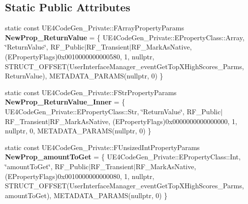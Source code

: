 \subsection*{Static Public Attributes}
\begin{DoxyCompactItemize}
\item 
\mbox{\label{struct_z___construct___u_function___a_user_interface_manager___get_top_x_high_scores___statics_a0b5ca5e952bd0680809e0706c322692e}} 
static const U\+E4\+Code\+Gen\+\_\+\+Private\+::\+F\+Array\+Property\+Params {\bfseries New\+Prop\+\_\+\+Return\+Value} = \{ U\+E4\+Code\+Gen\+\_\+\+Private\+::\+E\+Property\+Class\+::\+Array, \char`\"{}Return\+Value\char`\"{}, R\+F\+\_\+\+Public$\vert$R\+F\+\_\+\+Transient$\vert$R\+F\+\_\+\+Mark\+As\+Native, (E\+Property\+Flags)0x0010000000000580, 1, nullptr, S\+T\+R\+U\+C\+T\+\_\+\+O\+F\+F\+S\+E\+T(\+User\+Interface\+Manager\+\_\+event\+Get\+Top\+X\+High\+Scores\+\_\+\+Parms, Return\+Value), M\+E\+T\+A\+D\+A\+T\+A\+\_\+\+P\+A\+R\+A\+M\+S(nullptr, 0) \}
\item 
\mbox{\label{struct_z___construct___u_function___a_user_interface_manager___get_top_x_high_scores___statics_ac6b9b1cb1cc113a40d808ecae8dc31c2}} 
static const U\+E4\+Code\+Gen\+\_\+\+Private\+::\+F\+Str\+Property\+Params {\bfseries New\+Prop\+\_\+\+Return\+Value\+\_\+\+Inner} = \{ U\+E4\+Code\+Gen\+\_\+\+Private\+::\+E\+Property\+Class\+::\+Str, \char`\"{}Return\+Value\char`\"{}, R\+F\+\_\+\+Public$\vert$R\+F\+\_\+\+Transient$\vert$R\+F\+\_\+\+Mark\+As\+Native, (E\+Property\+Flags)0x0000000000000000, 1, nullptr, 0, M\+E\+T\+A\+D\+A\+T\+A\+\_\+\+P\+A\+R\+A\+M\+S(nullptr, 0) \}
\item 
\mbox{\label{struct_z___construct___u_function___a_user_interface_manager___get_top_x_high_scores___statics_abe99eeaac60ee4faea43c4ac5ee44198}} 
static const U\+E4\+Code\+Gen\+\_\+\+Private\+::\+F\+Unsized\+Int\+Property\+Params {\bfseries New\+Prop\+\_\+amount\+To\+Get} = \{ U\+E4\+Code\+Gen\+\_\+\+Private\+::\+E\+Property\+Class\+::\+Int, \char`\"{}amount\+To\+Get\char`\"{}, R\+F\+\_\+\+Public$\vert$R\+F\+\_\+\+Transient$\vert$R\+F\+\_\+\+Mark\+As\+Native, (E\+Property\+Flags)0x0010000000000080, 1, nullptr, S\+T\+R\+U\+C\+T\+\_\+\+O\+F\+F\+S\+E\+T(\+User\+Interface\+Manager\+\_\+event\+Get\+Top\+X\+High\+Scores\+\_\+\+Parms, amount\+To\+Get), M\+E\+T\+A\+D\+A\+T\+A\+\_\+\+P\+A\+R\+A\+M\+S(nullptr, 0) \}

\end{DoxyCompactItemize}
